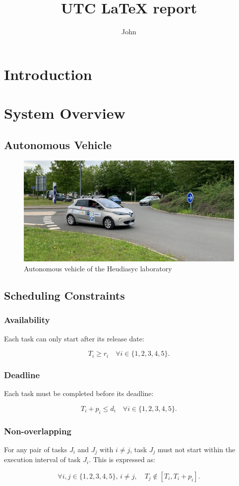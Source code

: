 \documentclass{utc-report}
\title{UTC LaTeX report}
\author{John \sc{DOE}}
\begin{document}
\maketitlepage

\tableofcontents{}

\pagebreak

\section{Introduction}
\lipsum[1]

\section{System Overview}

\subsection{Autonomous Vehicle}

\begin{figure}[h]
    \centering
    \includegraphics[width=0.7\linewidth]{img/zoe_hds.jpg}
    \caption{Autonomous vehicle of the Heudiasyc laboratory}
\end{figure}

\lipsum[2]

\pagebreak

\subsection{Scheduling Constraints}

\subsubsection*{Availability}

Each task can only start after its release date:

\[
    T_i \geq r_i \quad \forall i \in \{1, 2, 3, 4, 5\}.
\]

\subsubsection*{Deadline}

Each task must be completed before its deadline:

\[
    T_i + p_i \leq d_i \quad \forall i \in \{1, 2, 3, 4, 5\}.
\]

\subsubsection*{Non-overlapping}

For any pair of tasks \( J_i \) and \( J_j \) with \( i \neq j \), task \( J_j \) must not start within the execution interval of task \( J_i \). This is expressed as:

\[
    \forall i, j \in \{1, 2, 3, 4, 5\}, \, i \neq j, \quad T_j \notin [T_i, T_i + p_i].
\]
\end{document}
